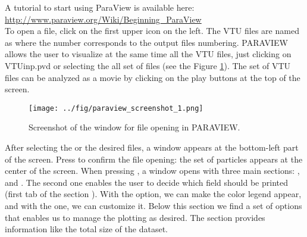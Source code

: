 \documentclass{../GPUSPHtemplate}
\begin{document}
A tutorial to start using ParaView is available here:\\
\url{http://www.paraview.org/Wiki/Beginning_ParaView}\\

To open a file, click on the first upper icon on the left. 
The VTU files are named as  where the number corresponds to
the output files numbering. 
PARAVIEW allows the user to visualize at the same time all the VTU files, 
just clicking on VTUinp.pvd or selecting the all set of  files
(see the Figure \ref{fig:paraview_screenshot_1}).
The set of VTU files can be analyzed as a movie by clicking on 
the play buttons at the top of the screen. 

\begin{figure}[h]
  \begin{center}
    \texttt{[image: ../fig/paraview\_screenshot\_1.png]}
    \caption{Screenshot of the window for file opening in PARAVIEW.}\label{fig:paraview_screenshot_1}   
  \end{center}
\end{figure}
After selecting the  or the desired  files, 
a window appears at the bottom-left part of the screen. 
Press  to confirm the file opening: the set of particles
appears at the center of the screen.
When pressing , a window opens with three main sections: 
,  and . 
The second one enables the user to decide which field should be printed 
(first tab of the section ). 
With the  option, we can make the color legend appear, 
and with the  one, we can customize it. 
Below this section we find a set of options that enables us to manage the plotting as desired.
The  section provides information like the total size of the dataset.\\
\end{document}
